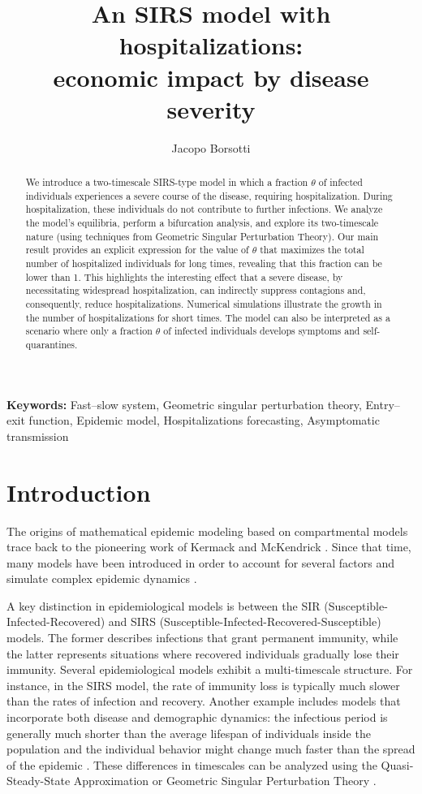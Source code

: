 \documentclass[11pt,reqno]{amsart}
\author[J. Borsotti]{Jacopo Borsotti}
\title[Hospitalizations and economic impact SIRS]{An SIRS model with hospitalizations: \\ economic impact by disease severity}
\theoremstyle{boldremark}
\begin{document}
\maketitle

\vspace*{-0.8cm}
\begin{abstract}
We introduce a two-timescale SIRS-type model in which a fraction $\theta$ of infected individuals experiences a severe course of the disease, requiring hospitalization. During hospitalization, these individuals do not contribute to further infections. We analyze the model's equilibria, perform a bifurcation analysis, and explore its two-timescale nature (using techniques from Geometric Singular Perturbation Theory). Our main result provides an explicit expression for the value of $\theta$ that maximizes the total number of hospitalized individuals for long times, revealing that this fraction can be lower than 1. This highlights the interesting effect that a severe disease, by necessitating widespread hospitalization, can indirectly suppress contagions and, consequently, reduce hospitalizations. Numerical simulations illustrate the growth in the number of hospitalizations for short times. The model can also be interpreted as a scenario where only a fraction $\theta$ of infected individuals develops symptoms and self-quarantines.
\end{abstract}

\tableofcontents

\textbf{Keywords:} Fast–slow system, Geometric singular perturbation theory, Entry–exit function, Epidemic model, Hospitalizations forecasting, Asymptomatic transmission

\section{Introduction}

\noindent The origins of mathematical epidemic modeling based on compartmental models trace back to the pioneering work of Kermack and McKendrick \cite{5}. Since that time, many models have been introduced in order to account for several factors and simulate complex epidemic dynamics \cite{MR4362890}.

A key distinction in epidemiological models is between the SIR (Susceptible-Infected-Recovered) and SIRS (Susceptible-Infected-Recovered-Susceptible) models. The former describes infections that grant permanent immunity, while the latter represents situations where recovered individuals gradually lose their immunity. Several epidemiological models exhibit a multi-timescale structure. For instance, in the SIRS model, the rate of immunity loss is typically much slower than the rates of infection and recovery. Another example includes models that incorporate both disease and demographic dynamics: the infectious period is generally much shorter than the average lifespan of individuals inside the population \cite{9, 3} and the individual behavior might change much faster than the spread of the epidemic \cite{13, 10, 11, 14,LI2025116273, 12}. These differences in timescales can be analyzed using the Quasi-Steady-State Approximation \cite{8, 7} or Geometric Singular Perturbation Theory \cite{15,16,17,12}.
\end{document}
